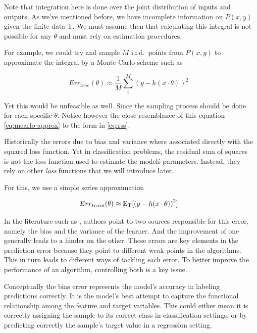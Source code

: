 Note that integration here is done over the joint distribution of inputs and outputs. As we've mentioned before, we have incomplete information on $P(x,y)$ given the finite data $ \mathrm{T}$.
We must assume then that calculating this integral is not possible for any $\theta$ and must rely on estimation procedures.

For example, we could try and sample $M$ i.i.d.\ points from $P(x,y)$ to approximate the integral by a Monte Carlo scheme such as

\begin{equation}\label{eq:mcarlo-approx}
Err_{true}(\theta) \approx \frac{1}{M} \sum_i^M {( y - h(x \cdot \theta) )}^2
\end{equation}

Yet this would be unfeasible as well. Since the sampling process should be done for each specific $\theta$. Notice however the close resemblance of this equation \cref{eq:mcarlo-approx} to the form in \cref{eq:rss}.

Historically the errors due to bias and variance where associated directly with the squared loss function.  Yet in classification problems, the residual sum of squares is not the loss function used to estimate the model\'s parameters. Instead, they rely on other \textit{loss} functions that we will introduce later.

For this, we use a simple series approximation

\begin{equation}
Err_{train}(\theta) \approx  \operatorname{\mathbb{E}}_{ \mathrm{T}}[{(y - h(x \cdot \theta) )}^2]
\end{equation}




In the literature such as \textcite{james-biasVarianceGeneral}, authors point to two sources responsible for this error, namely the bias and the variance of the learner. And the improvement of one generally leads to a hinder on the other. These errors are key elements in the prediction error because they point to different weak points in the algorithms. This in turn leads to different ways of tackling each error. To better improve the performance of an algorithm, controlling both is a key issue.

Conceptually the bias error represents the model's accuracy in labeling predictions correctly. It is the model's best attempt to capture the functional relationship among the feature and target variables. This could either mean it is correctly assigning the sample to its correct class in classification settings, or by predicting correctly the sample's target value in a regression setting.

